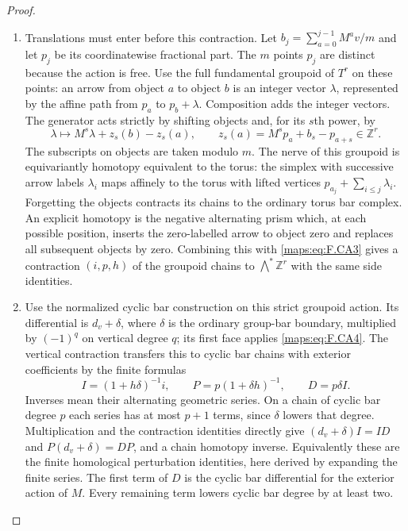 \begin{proof}
\begin{enumerate}[label=\arabic*.]
\item Translations must enter before this contraction.  Let
$b_j=\sum_{a=0}^{j-1}M^av/m$ and let $p_j$ be its coordinatewise
fractional part.  The $m$ points $p_j$ are distinct because the
action is free.  Use the full fundamental groupoid of $T^r$
on these points: an arrow from object $a$ to object $b$ is an
integer vector $\lambda$, represented by the affine path from
$p_a$ to $p_b+\lambda$.  Composition adds the integer vectors.
The generator acts strictly by shifting objects and, for its
$s$th power, by
\[
 \lambda\longmapsto M^s\lambda+z_s(b)-z_s(a),
 \qquad z_s(a)=M^sp_a+b_s-p_{a+s}\in\mathbb Z^r.             \tag{F.CA4}\label{maps:eq:F.CA4}
\]
The subscripts on objects are taken modulo $m$.
The nerve of this groupoid is equivariantly homotopy equivalent
to the torus: the simplex with successive arrow labels
$\lambda_i$ maps affinely to the torus with lifted vertices
$p_{a_j}+\sum_{i\leq j}\lambda_i$.
Forgetting the objects contracts its chains to the ordinary
torus bar complex.  An explicit homotopy is the negative
alternating prism which, at each possible position, inserts
the zero-labelled arrow to object zero and replaces all
subsequent objects by zero.  Combining this with \eqref{maps:eq:F.CA3}
gives a contraction $(i,p,h)$ of the groupoid chains to
$\bigwedge^*\mathbb Z^r$ with the same side identities.

\item Use the normalized cyclic bar construction on this strict
groupoid action.  Its differential is $d_v+\delta$, where
$\delta$ is the ordinary group-bar boundary, multiplied by
$(-1)^q$ on vertical degree $q$; its first face applies \eqref{maps:eq:F.CA4}.
The vertical contraction transfers this to cyclic bar chains
with exterior coefficients by the finite formulas
\[
 I=(1+h\delta)^{-1}i,\qquad
 P=p(1+\delta h)^{-1},\qquad D=p\delta I.                  \tag{F.CA5}\label{maps:eq:F.CA5}
\]
Inverses mean their alternating geometric series.  On a chain
of cyclic bar degree $p$ each series has at most $p+1$ terms,
since $\delta$ lowers that degree.  Multiplication and the
contraction identities directly give $(d_v+\delta)I=ID$ and
$P(d_v+\delta)=DP$,
and a chain homotopy inverse.  Equivalently these are the
finite homological perturbation identities, here derived by
expanding the finite series.  The first term of $D$ is the
cyclic bar differential for the exterior action of $M$.
Every remaining term lowers cyclic bar degree by at least two.


\end{enumerate}
\end{proof}
